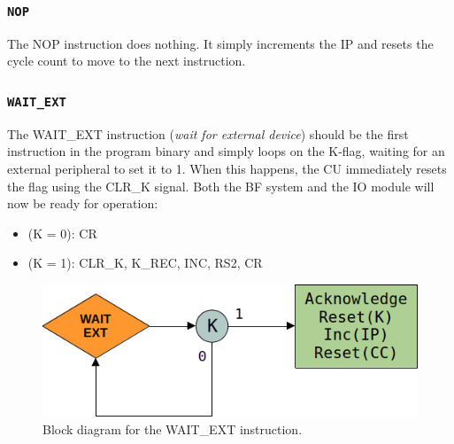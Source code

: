\subsubsection{\texttt{NOP}}
The NOP instruction does nothing. It simply increments the IP and resets the cycle count to move to the next instruction.

\subsubsection{\texttt{WAIT\_EXT}}
The WAIT\_EXT instruction (\emph{wait for external device}) should be the first instruction in the program binary and simply loops on the K-flag, waiting for an external peripheral to set it to 1. When this happens, the CU immediately resets the flag using the CLR\_K signal. Both the BF system and the IO module will now be ready for operation:
\begin{itemize}
 \item (K = 0): CR
 \item (K = 1): CLR\_K, K\_REC, INC, RS2, CR
\end{itemize}

\begin{figure}[H]
  \centering
  \includegraphics[scale=0.4]{img/waitextalg}
  \caption{Block diagram for the WAIT\_EXT instruction.}
  \label{fig:rightalg}
\end{figure}


